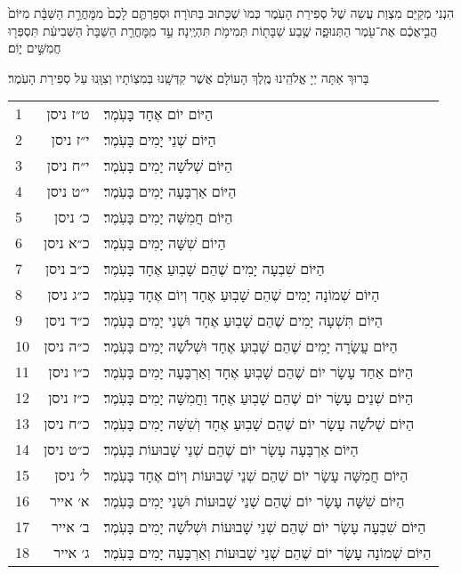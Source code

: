 \documentclass[twoside, openany, parskip=half, 11pt]{book}
\begin{document}
הִנְנִי מְקַיֵּם מִצְוַת עֲשֵה שֶׁל סְפִירַת הָעֽׂמֶר כְּמוׂ שֶׁכָּתוּב בַּתּוׂרָה׃ וּסְפַרְתֶּ֤ם לָכֶם֙ מִמׇּחֳרַ֣ת הַשַּׁבָּ֔ת מִיּוֹם֙ הֲבִ֣יאֲכֶ֔ם אֶת־עֹ֖מֶר הַתְּנוּפָ֑ה שֶׁ֥בַע שַׁבָּת֖וֹת תְּמִימֹ֥ת תִּהְיֶֽינָה׃ עַ֣ד מִֽמׇּחֳרַ֤ת הַשַּׁבָּת֙ הַשְּׁבִיעִ֔ת תִּסְפְּר֖וּ חֲמִשִּׁ֣ים י֑וֹם׃

בָּרוּךְ אַתָּה יְיָ אֱלֹהֵֽינוּ מֶֽלֶךְ הָעוֹלָם אֲשֶׁר קִדְּשָֽׁנוּ בְּמִצְוֹתָיו וְצִוָּֽנוּ עַל סְפִירַת הָעֹֽמֶר׃\\

\begin{scriptsize}
\begin{longtable}{ l | r | p{} }
1 & ט״ז ניסן & הַיּוֹם יוֹם אֶחָד בָּעֹֽמֶר׃ \\
2 & י״ז ניסן & הַיּוֹם שְׁנֵי יָמִים בָּעֹֽמֶר׃ \\
3 & י״ח ניסן & הַיּוֹם שְׁלֹשָׁה יָמִים בָּעֹֽמֶר׃ \\
4 & י״ט ניסן & הַיּוֹם אַרְבָּעָה יָמִים בָּעֹֽמֶר׃ \\
5 & כ׳ ניסן & הַיּוֹם חֲמִשָּׁה יָמִים בָּעֹֽמֶר׃ \\
6 & כ״א ניסן & הַיוֹם שִׁשָּׁה יָמִים בָּעֹֽמֶר׃ \\
7 & כ״ב ניסן & הַיּוֹם שִׁבְעָה יָמִים שֶׁהֵם שָׁבֽוּעַ אֶחָד בָּעֹֽמֶר׃ \\
8 & כ״ג ניסן & הַיּוֹם שְׁמוֹנָה יָמִים שֶׁהֵם שָׁבֽוּעַ אֶחָד וְיוֹם אֶחָד בָּעֹֽמֶר׃ \\
9 & כ״ד ניסן & הַיּוֹם תִּשְׁעָה יָמִים שֶׁהֵם שָׁבֽוּעַ אֶחָד וּשְׁנֵי יָמִים בָּעֹֽמֶר׃ \\
10 & כ״ה ניסן & הַיּוֹם עֲשָׂרָה יָמִים שֶׁהֵם שָׁבֽוּעַ אֶחָד וּשְׁלֹשָׁה יָמִים בָּעֹֽמֶר׃ \\
11 & כ״ו ניסן & הַיּוֹם אַחַד עָשָׂר יוֹם שֶׁהֵם שָׁבֽוּעַ אֶחָד וְאַרְבָּעָה יָמִים בָּעֹֽמֶר׃ \\
12 & כ״ז ניסן & הַיּוֹם שְׁנֵים עָשָׂר יוֹם שֶׁהֵם שָׁבֽוּעַ אֶחָד וַחֲמִשָּׁה יָמִים בָּעֹֽמֶר׃ \\
13 & כ״ח ניסן & הַיּוֹם שְׁלֹשָׁה עָשָׂר יוֹם שֶׁהֵם שָׁבֽוּעַ אֶחָד וְשִׁשָּׁה יָמִים בָּעֹֽמֶר׃ \\
14 & כ״ט ניסן & הַיּוֹם אַרְבָּעָה עָשָׂר יוֹם שֶׁהֵם שְׁנֵי שָׁבוּעוֹת בָּעֹֽמֶר׃ \\
15 & ל׳ ניסן & הַיּוֹם חֲמִשָּׁה עָשָׂר יוֹם שֶׁהֵם שְׁנֵי שָׁבוּעוֹת וְיוֹם אֶחָד בָּעֹֽמֶר׃ \\
16 & א׳ אייר & הַיּוֹם שִׁשָּׁה עָשָׂר יוֹם שֶׁהֵם שְׁנֵי שָׁבוּעוֹת וּשְׁנֵי יָמִים בָּעֹֽמֶר׃ \\
17 & ב׳ אייר & הַיּוֹם שִׁבְעָה עָשָׂר יוֹם שֶׁהֵם שְׁנֵי שָׁבוּעוֹת וּשְׁלֹשָׁה יָמִים בָּעֹֽמֶר׃ \\
18 & ג׳ אייר & הַיּוֹם שְׁמוֹנָה עָשָׂר יוֹם שֶׁהֵם שְׁנֵי שָׁבוּעוֹת וְאַרְבָּעָה יָמִים בָּעֹֽמֶר׃ \\

\end{longtable}
\end{scriptsize}
\end{document}
